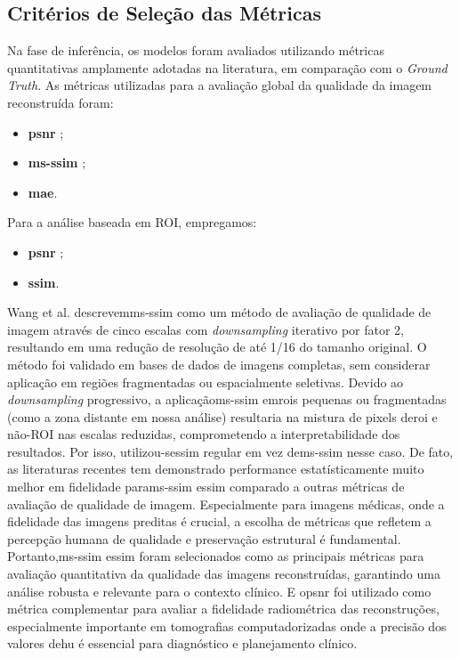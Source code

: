 \subsection{Critérios de Seleção das Métricas}

Na fase de inferência, os modelos foram avaliados utilizando métricas quantitativas amplamente adotadas na literatura, em comparação com o \textit{Ground Truth}. As métricas utilizadas para a avaliação global da qualidade da imagem reconstruída foram:
\begin{itemize}
    \item \textbf{\acrshort{psnr}} ;
    \item \textbf{\acrshort{ms-ssim}} ;
    \item \textbf{\acrshort{mae}}.
\end{itemize}
Para a análise baseada em ROI, empregamos:
\begin{itemize}
    \item \textbf{\acrshort{psnr}} ;
    \item \textbf{\acrshort{ssim}}.
\end{itemize}

Wang et al. \cite{wangMultiscaleStructuralSimilarity2003a} descrevem\acrshort{ms-ssim} como um método de avaliação de qualidade de imagem através de cinco escalas com \textit{downsampling} iterativo por fator 2, resultando em uma redução de resolução de até 1/16 do tamanho original. O método foi validado em bases de dados de imagens completas, sem considerar aplicação em regiões fragmentadas ou espacialmente seletivas. Devido ao \textit{downsampling} progressivo, a aplicação\acrshort{ms-ssim} em\acrshort{roi}s  pequenas ou fragmentadas (como a zona distante em nossa análise) resultaria na mistura de pixels de\acrshort{roi} e não-ROI  nas escalas reduzidas, comprometendo a interpretabilidade dos resultados. Por isso, utilizou-se\acrshort{ssim} regular em vez de\acrshort{ms-ssim} nesse caso.
De fato, as literaturas recentes tem demonstrado performance estatísticamente muito melhor em fidelidade para\acrshort{ms-ssim} e\acrshort{ssim} comparado a outras métricas de avaliação de qualidade de imagem\cite{linzhangFSIMFeatureSimilarity2011}. Especialmente para imagens médicas, onde a fidelidade das imagens preditas é crucial, a escolha de métricas que refletem a percepção humana de qualidade e preservação estrutural é fundamental. Portanto,\acrshort{ms-ssim} e\acrshort{ssim} foram selecionados como as principais métricas para avaliação quantitativa da qualidade das imagens reconstruídas, garantindo uma análise robusta e relevante para o contexto clínico. E o\acrshort{psnr} foi utilizado como métrica complementar para avaliar a fidelidade radiométrica das reconstruções, especialmente importante em tomografias computadorizadas onde a precisão dos valores de\acrshort{hu} é essencial para diagnóstico e planejamento clínico.

